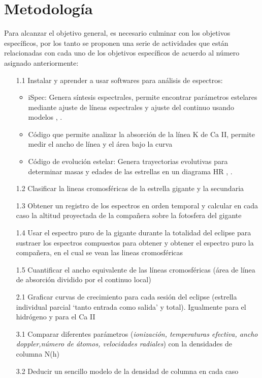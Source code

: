 \documentclass[11pt]{article}
\begin{document}

\section{Metodolog\'ia}

Para alcanzar el objetivo general, es necesario culminar con los objetivos específicos, por los tanto  se proponen una serie de actividades que están relacionadas con cada uno de los objetivos específicos de acuerdo al número asignado anteriormente:

\begin{itemize}

\item[1.1] Instalar y aprender a usar softwares para análisis de espectros:
\begin{itemize}
    \item iSpec: Genera síntesis espectrales, permite encontrar parámetros estelares mediante ajuste de líneas espectrales y ajuste del continuo usando modelos \cite{blanco2014determining}, \cite{blanco2019modern}.
    \item Código que permite analizar la absorción de la línea K de Ca II, permite medir el ancho de línea y el área bajo la curva
    \item Código de evolución estelar: Genera trayectorias evolutivas para determinar masas y edades de las estrellas en un diagrama HR \cite{pols1998stellar}, \cite{schroder1997critical}.
\end{itemize}
\item[1.2] Clasificar la lineas cromosféricas de la estrella gigante y la secundaria
\item[1.3] Obtener un registro de los espectros en orden temporal y calcular en cada caso la altitud proyectada de la compañera sobre la fotosfera del gigante

\item[1.4]  Usar el espectro puro de la gigante durante la totalidad del eclipse para sustraer los espectros compuestos para obtener y obtener el espectro puro la compañera, en el cual se vean las lineas cromosféricas

\item[1.5] Cuantificar el ancho equivalente de las líneas cromosféricas (área de línea de absorción dividido por el continuo local)

\item[2.1] Graficar curvas de crecimiento para cada sesión del eclipse (estrella individual parcial `tanto entrada como salida' y total). Igualmente para el hidrógeno y para el Ca II 

\item[3.1] Comparar diferentes parámetros (\textit{ionización, temperaturas efectiva, ancho doppler,número de átomos, velocidades radiales}) con la densidades de columna N(h)

\item[3.2] Deducir un sencillo modelo de la densidad de columna en cada caso

\end{itemize}
\end{document}
